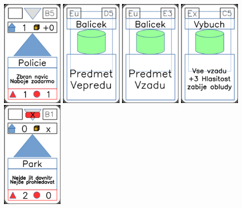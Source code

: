 \documentclass[a4paper]{article}
\begin{document}
	\includegraphics[width=3.0cm]{img-3_9}
	\includegraphics[width=3.0cm]{img-4_19}
	\includegraphics[width=3.0cm]{img-4_22}
	\includegraphics[width=3.0cm]{img-4_14}
	\includegraphics[width=3.0cm]{img-3_20}
\end{document}
